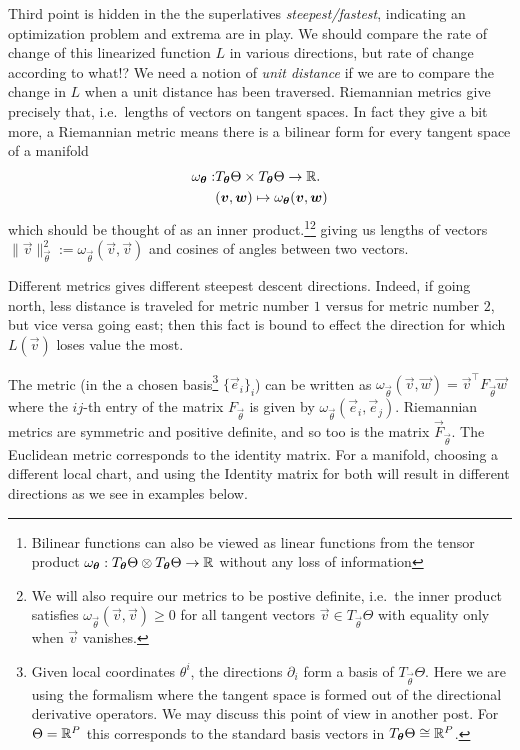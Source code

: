 \documentclass[12pt]{amsart}
\begin{document}
Third point is hidden in the the superlatives \emph{steepest/fastest}, indicating an optimization problem and extrema are in play. We should compare the rate of change of this linearized function $L$ in various directions, but rate of change according to what!? We need a notion of \emph{unit distance} if we are to compare the change in $L$ when a unit distance has been traversed. Riemannian metrics give precisely that, i.e.\ lengths of vectors on tangent spaces. In fact they give a bit more, a Riemannian metric means there is a bilinear form for every tangent space of a manifold
 \begin{align*}
 		\omega_{\mathbf{\boldsymbol{\theta}}} :& T_{\mathbf{\boldsymbol{\theta}}}\Theta \times T_{\mathbf{\boldsymbol{\theta}}}\Theta \to \mathbb{R}.\\
 		& (\mathbf{\boldsymbol{v}}, \mathbf{\boldsymbol{w}}) \mapsto \omega_{\mathbf{\boldsymbol{\theta}}}(\mathbf{\boldsymbol{v}}, \mathbf{\boldsymbol{w}})
 \end{align*}
 which should be thought of as an inner product.\footnote{Bilinear functions can also be viewed as linear functions from the tensor product $\omega_{\mathbf{\boldsymbol{\theta}}} : T_{\mathbf{\boldsymbol{\theta}}}\Theta \otimes T_{\mathbf{\boldsymbol{\theta}}}\Theta \to \mathbb{R}$ without any loss of information}\footnote{We will also require our metrics to be postive definite, i.e.\ the inner product satisfies $\omega_{\vec{\theta}} (\vec{v}, \vec{v}) \geq 0$ for all tangent vectors $\vec{v} \in T_{\vec{\theta}}\Theta$ with equality only when $\vec{v}$ vanishes.} giving us lengths of vectors $\|\vec{v}\|_{\vec{\theta}}^2:= \omega_{\vec{\theta}}(\vec{v}, \vec{v})$ and cosines of angles between two vectors.
 
 Different metrics gives different steepest descent directions. Indeed, if going north, less distance is traveled for metric number $1$ versus for metric number $2$, but vice versa going east; then this fact is bound to effect the direction for which $L(\vec{v})$ loses value the most. 
 
 The metric (in the a chosen basis\footnote{Given local coordinates $\theta^i$, the directions $\partial_i$ form a basis of $T_{\vec{\theta}}\Theta$. Here we are using the formalism where the tangent space is formed out of the directional derivative operators. We may discuss this point of view in another post. For $\Theta = \mathbb{R}^P$ this corresponds to the standard basis vectors in $T_{\mathbf{\boldsymbol{\theta}}} \Theta \cong \mathbb{R}^P$.} $\{\vec{e}_i\}_i$) can be written as $\omega_{\vec{\theta}}(\vec{v}, \vec{w}) = \vec{v}^\top F_{\vec{\theta}} \vec{w}$ where the $ij$-th entry of the matrix $F_{\vec{\theta}}$ is given by $\omega_{\vec{\theta}}(\vec{e}_i, \vec{e}_j)$. Riemannian metrics are symmetric and positive definite, and so too is the matrix $\vec{F}_{\vec{\theta}}$. The Euclidean metric corresponds to the identity matrix. For a manifold, choosing a different local chart, and using the Identity matrix for both will result in different directions as we see in examples below.
 
\end{document}
